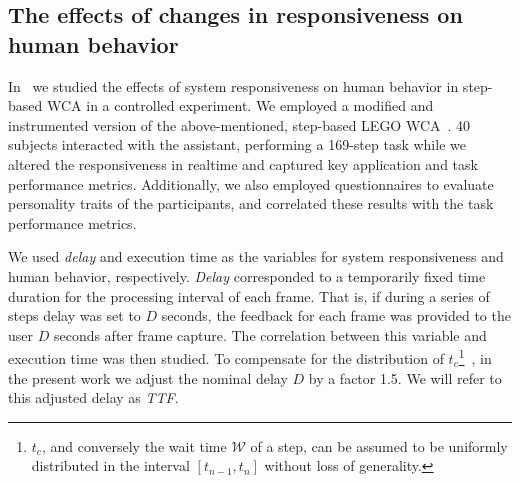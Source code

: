 

\subsection{The effects of changes in responsiveness on human behavior}\label{ssec:plos}

In~\cite{olguinmunoz:impact2021} we studied the effects of system responsiveness on human behavior in step-based \gls{WCA} in a controlled experiment.
We employed a modified and instrumented version of the above-mentioned, step-based LEGO \gls{WCA}~\cite{Chen2015LEGO}.
\num{40} subjects interacted with the assistant, performing a \num{169}-step task while we altered the responsiveness in realtime and captured key application and task performance metrics.
Additionally, we also employed questionnaires to evaluate personality traits of the participants, and correlated these results with the task performance metrics.

We used \emph{delay} and execution time as the variables for system responsiveness and human behavior, respectively.
\emph{Delay} corresponded to a temporarily fixed time duration for the processing interval of each frame.
That is, if during a series of steps delay was set to \( D \) seconds, the feedback for each frame was provided to the user \( D \) seconds after frame capture.
The correlation between this variable and execution time was then studied.
To compensate for the distribution of \( t_c \)\footnote{\( t_c \), and conversely the wait time \( \mathcal{W} \) of a step, can be assumed to be uniformly distributed in the interval \( [t_{n - 1}, t_n] \) without loss of generality.}~\cite{olguinmunoz:impact2021}, in the present work we adjust the nominal delay \( D \) by a factor \num{1.5}.
We will refer to this adjusted delay as \emph{\acf{TTF}}.

